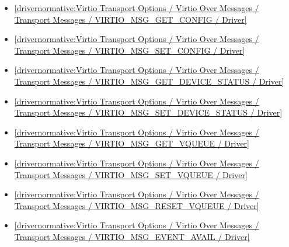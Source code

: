 \begin{itemize}
\item \ref{drivernormative:Virtio Transport Options / Virtio Over Messages / Transport Messages / VIRTIO_MSG_GET_CONFIG / Driver}
\item \ref{drivernormative:Virtio Transport Options / Virtio Over Messages / Transport Messages / VIRTIO_MSG_SET_CONFIG / Driver}
\item \ref{drivernormative:Virtio Transport Options / Virtio Over Messages / Transport Messages / VIRTIO_MSG_GET_DEVICE_STATUS / Driver}
\item \ref{drivernormative:Virtio Transport Options / Virtio Over Messages / Transport Messages / VIRTIO_MSG_SET_DEVICE_STATUS / Driver}
\item \ref{drivernormative:Virtio Transport Options / Virtio Over Messages / Transport Messages / VIRTIO_MSG_GET_VQUEUE / Driver}
\item \ref{drivernormative:Virtio Transport Options / Virtio Over Messages / Transport Messages / VIRTIO_MSG_SET_VQUEUE / Driver}
\item \ref{drivernormative:Virtio Transport Options / Virtio Over Messages / Transport Messages / VIRTIO_MSG_RESET_VQUEUE / Driver}
\item \ref{drivernormative:Virtio Transport Options / Virtio Over Messages / Transport Messages / VIRTIO_MSG_EVENT_AVAIL / Driver}
\end{itemize}

























